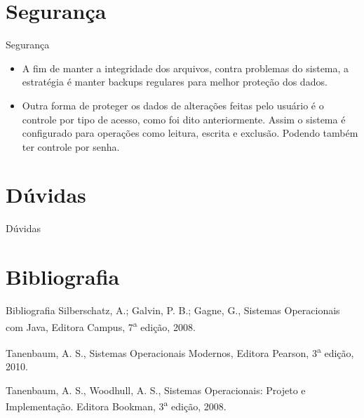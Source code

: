 \documentclass[10pt,brazil]{beamer}
\begin{document}
\section{Segurança}%

\begin{frame}{Segurança}
	\begin{itemize}
	\item A fim de manter a integridade dos arquivos, contra problemas do sistema, a estratégia é manter backups regulares para melhor proteção dos dados.
	\item Outra forma de proteger os dados de alterações feitas pelo usuário é o controle por tipo de acesso, como foi dito anteriormente. Assim o sistema é configurado para operações como leitura, escrita e exclusão. Podendo também ter controle por senha.
	\end{itemize}
\end{frame}

\section{Dúvidas}
\begin{frame}{Dúvidas}
\end{frame}
\section {Bibliografia}
\begin{frame}{Bibliografia}
\noindent[1] Silberschatz, A.; Galvin, P. B.; Gagne, G., Sistemas Operacionais com Java, Editora Campus, 7\textsuperscript{a} edição, 2008.
\newline

\noindent[2] Tanenbaum, A. S., Sistemas Operacionais Modernos, Editora Pearson, 3\textsuperscript{a} edição, 2010.
\newline

\noindent[3] Tanenbaum, A. S., Woodhull, A. S., Sistemas Operacionais: Projeto e Implementação. Editora Bookman, 3\textsuperscript{a} edição, 2008.
\end{frame}
\end{document}
